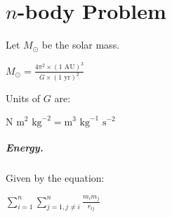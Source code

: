\chapter{$n$-body Problem}

Let $M_{\odot}$ be the solar mass.

$M_{\odot} = \frac{4\pi^2 \times (1 \text{ AU})^3}{G \times (1 \text{ yr})^2}$

\noindent Units of $G$ are:

$\text{N} \text{ m}^2 \text{ kg}^{-2}
  = \text{m}^3 \text{ kg}^{-1} \text{ s}^{-2}$

\paragraph{Energy.}

Given by the equation:  

$\sum\limits_{i=1}^n \sum\limits_{j=1, j \neq i}^n \frac{m_i m_j}{r_{ij}}$

